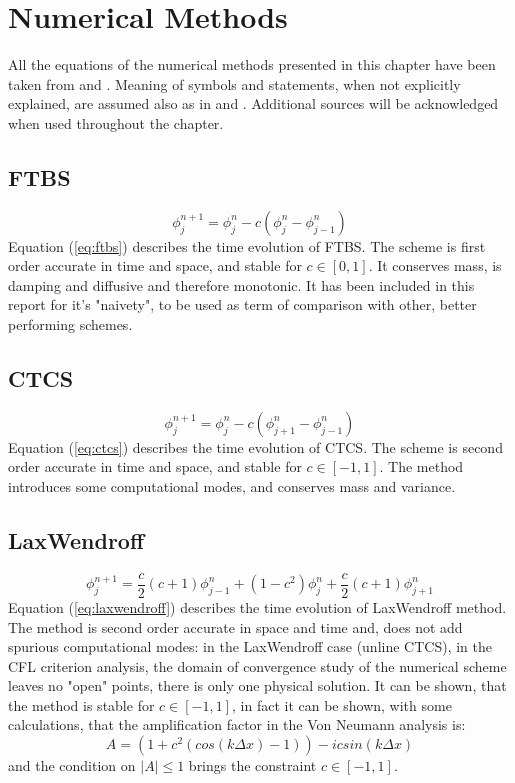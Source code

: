 
\section{Numerical Methods}
All the equations of the numerical methods presented in this chapter have been taken from \cite{mpebook} and \cite{nmnotes}. Meaning of symbols and statements, when not explicitly explained, are assumed also as in \cite{mpebook} and \cite{nmnotes}. Additional sources will be acknowledged when used throughout the chapter.

\subsection{FTBS}

\begin{equation}
\phi_j^{n+1}=\phi_j^{n}-c(\phi_j^{n}-\phi_{j-1}^{n})
\label{eq:ftbs}
\end{equation}
Equation (\ref{eq:ftbs}) describes the time evolution of FTBS. The scheme is first order accurate in time and space, and stable for $c\in[0,1]$. It conserves mass, is damping and diffusive and therefore monotonic. It has been included in this report for it's "naivety", to be used as term of comparison with other, better performing schemes.


\subsection{CTCS}
\begin{equation}
\phi_j^{n+1}=\phi_j^{n}-c(\phi_{j+1}^{n}-\phi_{j-1}^{n})
\label{eq:ctcs}
\end{equation}
Equation (\ref{eq:ctcs}) describes the time evolution of CTCS. The scheme is second order accurate in time and space, and stable for $c\in[-1,1]$. The method introduces some computational modes, and conserves mass and variance.


\subsection{LaxWendroff}
\begin{equation}
\phi_j^{n+1}=\frac{c}{2}(c+1)\phi_{j-1}^{n}+(1-c^2)\phi_{j}^{n}+\frac{c}{2}(c+1)\phi_{j+1}^{n}
\label{eq:laxwendroff}
\end{equation}
Equation (\ref{eq:laxwendroff}) describes the time evolution of LaxWendroff method. The method is second order accurate in space and time and, does not add spurious computational modes: in the LaxWendroff case (unline CTCS), in the CFL criterion analysis, the domain of convergence study of the numerical scheme leaves no "open" points, there is only one physical solution. It can be shown, that the method is stable for $c\in[-1,1]$, in fact it can be shown, with some calculations, that the amplification factor in the Von Neumann analysis is:
\begin{equation}
\label{eq:laxwen_vonneumann}
A=(1+c^2(cos(k\Delta x)-1))-icsin(k\Delta x)
\end{equation}
and the condition on $|A|\leq1$ brings the constraint $c\in[-1,1]$.

